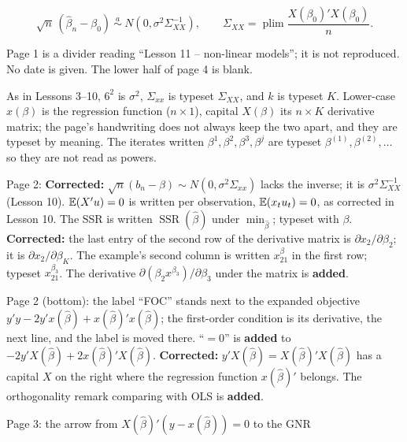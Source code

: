 \documentclass[11pt]{article}
\begin{document}
\[ \sqrt{n}\,(\hat\beta_{n} - \beta_{0}) \ \overset{a}{\sim}\ N(0, \sigma^{2}\Sigma_{XX}^{-1}),
   \qquad \Sigma_{XX} = \operatorname*{plim}\frac{X(\beta_{0})'X(\beta_{0})}{n}. \]


\begin{transcriptnotes}
  \item Page 1 is a divider reading ``Lesson 11 -- non-linear models''; it is not
        reproduced. No date is given. The lower half of page 4 is blank.
  \item As in Lessons 3--10, $6^{2}$ is $\sigma^{2}$, $\Sigma_{xx}$ is typeset
        $\Sigma_{XX}$, and $k$ is typeset $K$. Lower-case $x(\beta)$ is the regression
        function ($n\times 1$), capital $X(\beta)$ its $n\times K$ derivative matrix;
        the page's handwriting does not always keep the two apart, and they are typeset
        by meaning. The iterates written $\beta^{1}, \beta^{2}, \beta^{3}, \beta^{j}$
        are typeset $\beta^{(1)}, \beta^{(2)}, \ldots$ so they are not read as powers.
  \item Page 2: \textbf{Corrected:} $\sqrt{n}(b_{n} - \beta) \sim N(0, \sigma^{2}\Sigma_{xx})$
        lacks the inverse; it is $\sigma^{2}\Sigma_{XX}^{-1}$ (Lesson 10). $\mathbb{E}(X'u) = 0$ is
        written per observation, $\mathbb{E}(x_{t}u_{t}) = 0$, as corrected in Lesson 10. The
        SSR is written $\operatorname{SSR}(\hat\beta)$ under $\min_{\hat\beta}$; typeset
        with $\beta$. \textbf{Corrected:} the last entry of the second row of the
        derivative matrix is $\partial x_{2}/\partial\beta_{2}$; it is
        $\partial x_{2}/\partial\beta_{K}$. The example's second column is written
        $x_{21}^{\beta}$ in the first row; typeset $x_{21}^{\beta_{3}}$. The derivative
        $\partial(\beta_{2}x^{\beta_{3}})/\partial\beta_{3}$ under the matrix is
        \textbf{added}.
  \item Page 2 (bottom): the label ``FOC'' stands next to the expanded objective
        $y'y - 2y'x(\hat\beta) + x(\hat\beta)'x(\hat\beta)$; the first-order condition is
        its derivative, the next line, and the label is moved there. ``$=0$'' is
        \textbf{added} to $-2y'X(\hat\beta) + 2x(\hat\beta)'X(\hat\beta)$.
        \textbf{Corrected:} $y'X(\hat\beta) = X(\hat\beta)'X(\hat\beta)$ has a capital
        $X$ on the right where the regression function $x(\hat\beta)'$ belongs. The
        orthogonality remark comparing with OLS is \textbf{added}.
  \item Page 3: the arrow from $X(\hat\beta)'(y - x(\hat\beta)) = 0$ to the GNR

\end{transcriptnotes}
\end{document}

